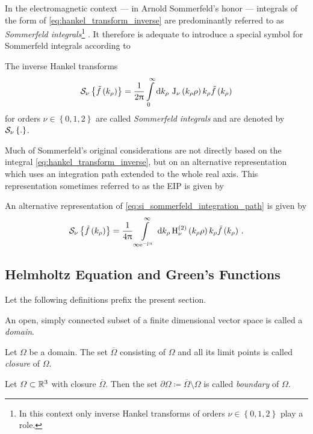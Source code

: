 In the electromagnetic context --- in Arnold Sommerfeld's honor --- integrals of
the form of \eqref{eq:hankel_transform_inverse} are predominantly referred to
as \emph{Sommerfeld integrals}\footnote{In this context only inverse Hankel
transforms of orders $\nu \in \left\{0, 1, 2\right\}$ play a role.}
\cite{Sommerfeld1909, Mosig2021}.
It therefore is adequate to introduce a special symbol for Sommerfeld integrals
according to
\begin{definition}	
	The inverse Hankel transforms
	\begin{equation}\label{eq:si_sommerfeld_integration_path}
		\mathcal{S}_{\nu} \left\{\tilde{f} \left( k_\rho \right)\right\} =
		\frac{1}{2\uppi}
		\int\limits_{0}^{\infty} \mathrm{d} k_\rho \,
		\operatorname{J}_{\nu}\left(k_\rho \rho\right) k_\rho
		\tilde{f} \left(k_\rho\right) 
	\end{equation}
	for orders $\nu \in \left\{0, 1, 2\right\}$ are called \emph{Sommerfeld
	integrals} and are denoted by $\mathcal{S}_{\nu} \left\{.\right\}$.
\end{definition}

Much of Sommerfeld's original considerations \cite{Sommerfeld1909} are not
directly based on the integral \eqref{eq:hankel_transform_inverse}, but
on an alternative representation which uses an integration path extended to
the whole real axis. This representation sometimes referred to as the \ac{EIP}
is given by
\begin{corollary}
	An alternative representation of \eqref{eq:si_sommerfeld_integration_path}
	is given by
	\begin{equation}\label{eq:si_extended_integration_path}
		\mathcal{S}_{\nu} \left\{\tilde{f} \left( k_\rho \right)\right\} =
		\frac{1}{4\uppi}
		\int\limits_{\infty \mathrm{e}^{-\mathrm{j} \uppi}\,}^{\infty} \mathrm{d} k_\rho 
		\operatorname{H}_{\nu}^{\left( 2 \right)} \left(k_\rho \rho\right) k_\rho 
		\tilde{f} \left(k_\rho\right) \, .
	\end{equation}
\end{corollary}






\subsection{Helmholtz Equation and Green's Functions}

Let the following definitions prefix the present section.
\begin{definition}[Domain]
	An open, simply connected subset of a finite dimensional vector space is
	called a \emph{domain}.
\end{definition}
\begin{definition}[Closure]
	Let $\Omega$ be a domain.
	The set $\overline{\Omega}$ consisting of $\Omega$ and all its limit points
	is called \emph{closure} of $\Omega$.
\end{definition}
\begin{definition}[Boundary]
	Let $\Omega \subset \mathbb{R}^3$ with closure $\overline{\Omega}$.
	Then the set $\partial\Omega \coloneqq \overline{\Omega}\setminus\Omega$
	is called \emph{boundary} of $\Omega$.
\end{definition}

